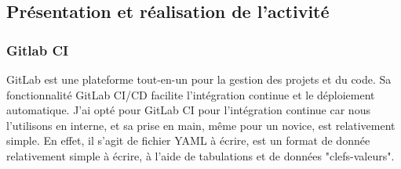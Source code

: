 \documentclass[a4paper, 11pt]{report}
\begin{document}
\subsection{Présentation et réalisation de l'activité}
\subsubsection{Gitlab CI}
GitLab est une plateforme tout-en-un pour la gestion des projets et du code.
Sa fonctionnalité GitLab CI/CD facilite l'intégration continue et le déploiement automatique.
J'ai opté pour GitLab CI pour l'intégration continue car nous l'utilisons en interne, et sa prise en main, même pour un novice, est relativement simple.
En effet, il s'agit de fichier YAML à écrire, est un format de donnée relativement simple à écrire, à l'aide de tabulations et de données "clefs-valeurs".
\end{document}
